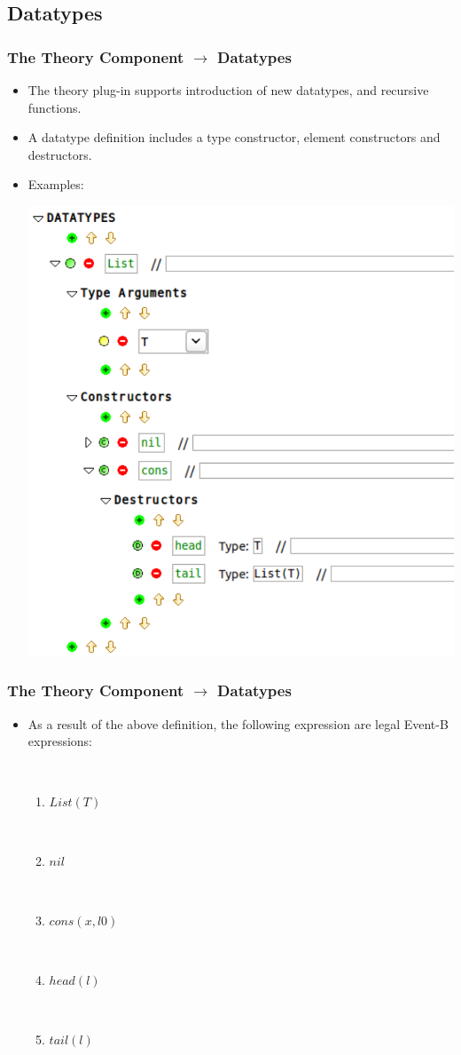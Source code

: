 \documentclass{beamer}
\begin{document}
\subsection{Datatypes}
	\begin{frame}
		\frametitle{The Theory Component $\rightarrow$ Datatypes}
		\begin{itemize}
			\item The theory plug-in supports introduction of new datatypes, and recursive functions.
			\item A datatype definition includes a type constructor, element constructors and destructors.
			\item Examples:
				\begin{center}
					\includegraphics[scale=0.3]{ListDT}
				\end{center}
		\end{itemize}
	\end{frame}
	\begin{frame}
		\frametitle{The Theory Component $\rightarrow$ Datatypes}
		\begin{itemize}
			\item As a result of the above definition, the following expression are legal Event-B expressions:

~

				\begin{enumerate}
					\item $List(T)$

~

					\item $nil$

~
					\item $cons(x, l0)$

~
					\item $head(l)$

~
					\item $tail(l)$
				\end{enumerate}
		\end{itemize}
	\end{frame}
\end{document}
